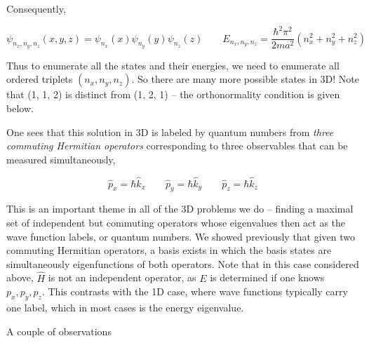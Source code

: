   Consequently, 

  \[
    \psi_{n_x, n_y, n_z} (x, y, z) = \psi_{n_x} (x) \psi_{n_y}(y) \psi_{n_z}(z)
    \qquad E_{n_x, n_y, n_z} = \frac{\hbar^2 \pi^2}{2ma^2} ( n_x^2 + n_y^2
    + n_z^2)
  \] \vspace{3px}
  
  
  Thus to enumerate all the states and their energies, we need to enumerate all
  ordered triplets $(n_x, n_y, n_z)$. So there are many more possible states in
  3D! Note that (1, 1, 2) is distinct from (1, 2, 1) -- the orthonormality
  condition is given below. 


  One sees that this solution in 3D is labeled by quantum numbers from
  \textit{three commuting Hermitian operators} corresponding to three
  observables that can be measured simultaneously, 

  \[
  \hat{p}_x = \hbar \hat{k}_x \qquad \hat{p}_y = \hbar \hat{k}_y \qquad
  \hat{p}_z = \hbar \hat{k}_z
  \] \vspace{3px}
  
  This is an important theme in all of the 3D problems we do -- finding a maximal set of independent
but commuting operators whose eigenvalues then act as the wave function labels,
or quantum numbers. We showed previously that given two commuting Hermitian operators, a basis exists in
which the basis states are simultaneously eigenfunctions of both operators.
Note that in this case considered above, $\hat{H}$ is not an independent
operator, as $E$ is determined if one knows $p_x, p_y, p_z$. This contrasts
with the 1D case, where wave functions typically carry one label, which in most
cases is the energy eigenvalue. 

A couple of observations 

